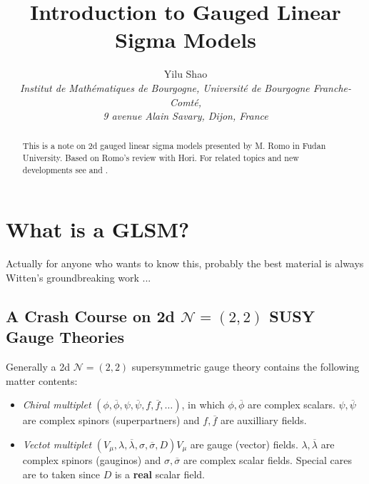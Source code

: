 \documentclass{article}
\title{Introduction to Gauged Linear Sigma Models}
\author{Yilu Shao\\ \footnotesize{\it Institut de Mathématiques de Bourgogne, Université de Bourgogne Franche-Comté,}\\ \footnotesize{\it 9 avenue Alain Savary, Dijon, France}}
\date{}
\begin{document}
\maketitle

\begin{abstract}
    This is a note on 2d gauged linear sigma models presented by M. Romo in Fudan University. Based on Romo's review \cite{hori2014notes} with Hori. For related topics and new developments see \cite{Hori:2013ika} and \cite{Knapp:2020oba}.
\end{abstract}

\tableofcontents

\section{What is a GLSM?}
Actually for anyone who wants to know this, probably the best material is always Witten's groundbreaking work \cite{Witten:1993yc}...
\subsection{A Crash Course on 2d $\mathcal{N}=(2,2)$ SUSY Gauge Theories}
Generally a 2d $\mathcal{N}=(2,2)$ supersymmetric gauge theory contains the following matter contents:
\begin{itemize}
    \item \textit{Chiral multiplet} $(\phi,\overline{\phi},\psi,\overline{\psi},f,\overline{f},\ldots)$, in which $\phi,\overline{\phi}$ are complex scalars. $\psi,\overline{\psi}$ are complex spinors (superpartners) and $f,\overline{f}$ are auxilliary fields.
    \item \textit{Vectot multiplet} $(V_\mu,\lambda,\overline{\lambda},\sigma,\overline{\sigma},D)$$V_\mu$ are gauge (vector) fields. $\lambda,\overline{\lambda}$ are complex spinors (gauginos) and $\sigma,\overline{\sigma}$ are complex scalar fields. Special cares are to taken since $D$ is a \textbf{real} scalar field.
\end{itemize}
\end{document}
